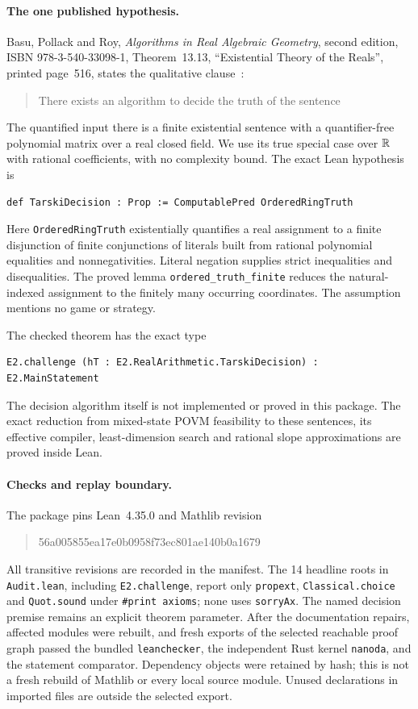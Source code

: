\paragraph{The one published hypothesis.}
Basu, Pollack and Roy, \emph{Algorithms in Real Algebraic Geometry}, second edition, ISBN 978-3-540-33098-1, Theorem~13.13, ``Existential Theory of the Reals'', printed page~516, states the qualitative clause~\cite{BPR06}:
\begin{quote}
There exists an algorithm to decide the truth of the sentence
\end{quote}
The quantified input there is a finite existential sentence with a quantifier-free polynomial matrix over a real closed field. We use its true special case over $\mathbb R$ with rational coefficients, with no complexity bound. The exact Lean hypothesis is
\begin{verbatim}
def TarskiDecision : Prop := ComputablePred OrderedRingTruth
\end{verbatim}
Here \texttt{OrderedRingTruth} existentially quantifies a real assignment to a finite disjunction of finite conjunctions of literals built from rational polynomial equalities and nonnegativities. Literal negation supplies strict inequalities and disequalities. The proved lemma \texttt{ordered\_truth\_finite} reduces the natural-indexed assignment to the finitely many occurring coordinates. The assumption mentions no game or strategy. \begin{samepage}
The checked theorem has the exact type
\begin{verbatim}
E2.challenge (hT : E2.RealArithmetic.TarskiDecision) : E2.MainStatement
\end{verbatim}
\end{samepage}
The decision algorithm itself is not implemented or proved in this package. The exact reduction from mixed-state POVM feasibility to these sentences, its effective compiler, least-dimension search and rational slope approximations are proved inside Lean.

\paragraph{Checks and replay boundary.}
The package pins Lean~4.35.0 and Mathlib revision
\begin{quote}\ttfamily
56a005855ea17e0b0958f73ec801ae140b0a1679
\end{quote}
All transitive revisions are recorded in the manifest. The 14 headline roots in \texttt{Audit.lean}, including \texttt{E2.challenge}, report only \texttt{propext}, \texttt{Classical.choice} and \texttt{Quot.sound} under \texttt{\#print axioms}; none uses \texttt{sorryAx}. The named decision premise remains an explicit theorem parameter. After the documentation repairs, affected modules were rebuilt, and fresh exports of the selected reachable proof graph passed the bundled \texttt{leanchecker}, the independent Rust kernel \texttt{nanoda}, and the statement comparator. Dependency objects were retained by hash; this is not a fresh rebuild of Mathlib or every local source module. Unused declarations in imported files are outside the selected export.

